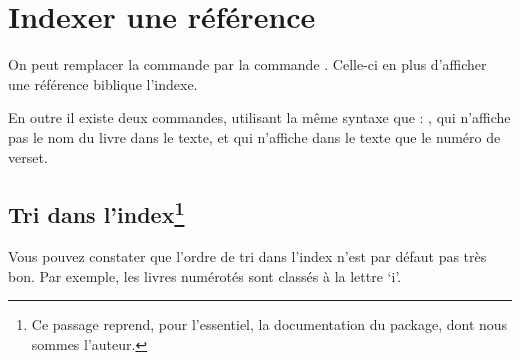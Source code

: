 \section{Indexer une référence}

On peut remplacer la commande  par la commande . Celle-ci en plus d'afficher une référence biblique l'indexe.

En outre il existe deux commandes, utilisant la même syntaxe que  : , qui n'affiche pas le nom du livre dans le texte, et  qui n'affiche dans le texte que le numéro de verset.

\subsection[Tri dans l'index]{Tri dans l'index\footnote{Ce passage reprend, pour l'essentiel, la documentation du package, dont nous sommes l'auteur.}}

Vous pouvez constater que l'ordre de tri dans l'index n'est par défaut pas très bon. Par exemple, les livres numérotés sont classés à la lettre `i'. 

